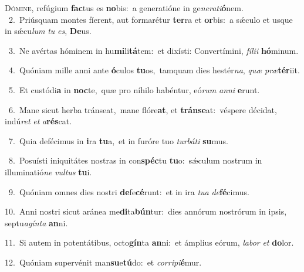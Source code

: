 \lettrine{\initial\textcolor{\initialcolor}{D}}{ómine,} refúgium \textbf{fac}\-tus es \textbf{no}\-bis:~\star a generatióne in ge\-\textit{ne}\-\textit{ra}\textit{ti}\textbf{ó}nem.\\
{\numbfont\textcolor{\numbcolor}{~2.}}~Priúsquam montes fíerent, aut formarétur \textbf{ter}\-ra et \textbf{or}\-bis:~\star a sǽculo et usque in sǽcu\textit{lum} \textit{tu} \textit{es}\-, \textbf{De}\-us.\par
{\numbfont\textcolor{\numbcolor}{~3.}}~Ne avértas hóminem in hu\-\textbf{mi}\-li\-\textbf{tá}\-tem:~\star et dixísti: Convertímini, \textit{fí}\-\textit{li}\textit{i} \textbf{hó}\-minum.\par
{\numbfont\textcolor{\numbcolor}{~4.}}~Quóniam mille anni ante \textbf{ó}\-culos \textbf{tu}\-os,~\star tamquam dies hestér\-\textit{na}\-, \textit{quæ} \textit{præ}\-\textbf{tér}iit.\par
{\numbfont\textcolor{\numbcolor}{~5.}}~Et custódi\textbf{a} in \textbf{noc}\-te,~\star quæ pro níhilo habéntur, eó\textit{rum} \textit{an}\-\textit{ni} \textbf{e}\-runt.\par
{\numbfont\textcolor{\numbcolor}{~6.}}~Mane sicut herba tránseat,~\dagger mane flóre\-\textbf{at}\-, et \textbf{tráns}\-\textbf{e}at:~\star véspere décidat, indú\textit{ret} \textit{et} \textit{a}\-\textbf{rés}cat.\par
{\numbfont\textcolor{\numbcolor}{~7.}}~Quia defécimus in \textbf{i}\-ra \textbf{tu}\-a,~\star et in furóre tuo \textit{tur}\-\textit{bá}\textit{ti} \textbf{su}\-mus.\par
{\numbfont\textcolor{\numbcolor}{~8.}}~Posuísti iniquitátes nostras in con\-\textbf{spéc}\-tu \textbf{tu}\-o:~\star sǽculum nostrum in illuminatió\textit{ne} \textit{vul}\-\textit{tus} \textbf{tu}\-i.\par
{\numbfont\textcolor{\numbcolor}{~9.}}~Quóniam omnes dies nostri \textbf{de}\-fe\-\textbf{cé}\-runt:~\star et in ira \textit{tu}\-\textit{a} \textit{de}\-\textbf{fé}cimus.\par
{\numbfont\textcolor{\numbcolor}{10.}}~Anni nostri sicut aránea me\-\textbf{di}\-ta\-\textbf{bún}\-tur:~\star dies annórum nostrórum in ipsis, septu\-\textit{a}\-\textit{gín}\textit{ta} \textbf{an}\-ni.\par
{\numbfont\textcolor{\numbcolor}{11.}}~Si autem in potentátibus, octo\-\textbf{gín}\-ta \textbf{an}\-ni:~\star et ámplius eórum, \textit{la}\-\textit{bor} \textit{et} \textbf{do}\-lor.\par
{\numbfont\textcolor{\numbcolor}{12.}}~Quóniam supervénit man\-\textbf{su}\-e\-\textbf{tú}\-do:~\star et \textit{cor}\-\textit{ri}\textit{pi}\textbf{é}mur.\par
